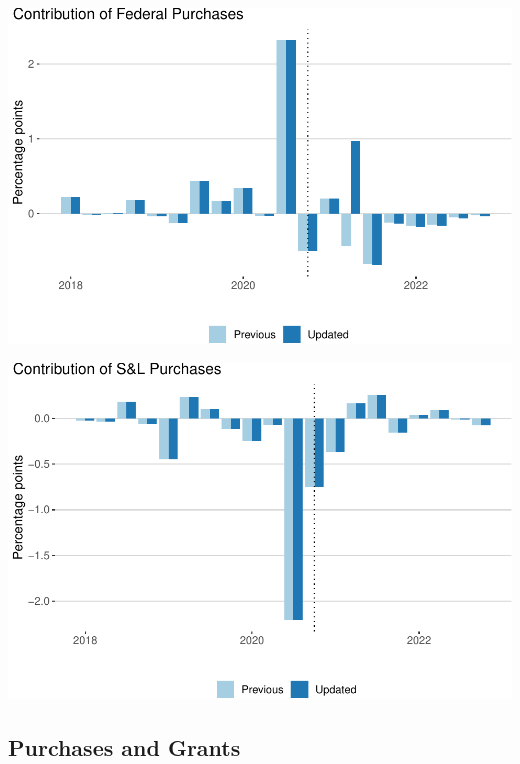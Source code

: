 \documentclass[
]{article}
\begin{document}
\begin{center}\includegraphics{compare-update_files/figure-latex/federal-cont-1} \end{center}

\begin{center}\includegraphics{compare-update_files/figure-latex/state-cont-1} \end{center}

\hypertarget{purchases-and-grants}{%
\subsection{Purchases and Grants}\label{purchases-and-grants}}
\end{document}
